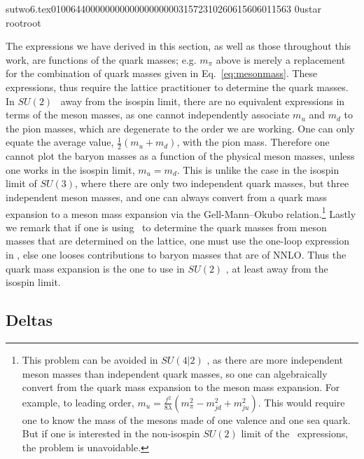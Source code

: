                                                                                                                                                                                                                                                                                       sutwo6.tex                                                                                          0100644 0000000 0000000 00000315723 10260615606 011563  0                                                                                                    ustar   root                            root                                                                                                                                                                                                                   \documentclass[prd,amssymb,amsmath,showpacs,nofootinbib,superscriptaddress]{revtex4}
\begin{document}
The expressions we have derived in this section, as well as those
throughout this work, are functions of the quark masses;
e.g. $m_\pi$ above is 
merely a replacement for the combination of quark masses given in
Eq.~\eqref{eq:mesonmass}.  These expressions, thus require the
lattice practitioner to determine the quark masses.  
In $SU(2)$ \CPT\ away from the isospin limit, there are no equivalent
expressions in terms of the meson masses, as one cannot independently associate 
$m_u$ and $m_d$ to the pion masses, which are
degenerate to the order we are working.  One can only equate the
average value, $\frac{1}{2} (m_u +m_d)$, with the pion mass.
Therefore one cannot plot the 
baryon masses as a function of the physical meson masses, unless one
works in the isospin limit, $m_u = m_d$.  This is unlike the case in
the isospin limit of $SU(3)$, where there are only two independent
quark masses, but three independent meson masses, and one can always
convert from a quark mass expansion to a meson mass expansion via the
Gell-Mann--Okubo relation.\footnote{%
This problem can be avoided in $SU(4|2)$ \PQCPT, as there are more
independent meson masses than independent quark masses, so one can
algebraically convert from the quark mass expansion to the
meson mass expansion.  For example, to leading order,
$m_u = \frac{f^2}{8 \lambda} \left(m_\pi^2 -m^2_{jd} +m^2_{ju} \right)$.
This would require one to know the mass of the mesons made of one
valence and one sea quark.  But if one is interested in the
non-isospin $SU(2)$ limit of the \PQCPT\ expressions, the problem is unavoidable.}
Lastly we remark that if one is using \CPT\ to determine the quark
masses from meson masses that are determined on the lattice, one must
use the one-loop expression in \CPT, else one looses contributions to
baryon masses that are of NNLO.  Thus the quark mass expansion is the one to
use in $SU(2)$ \CPT, at least away from the
isospin limit.














%
%
%
%
%
%
%
%
%
%
%
%
\subsection{Deltas}
\end{document}
